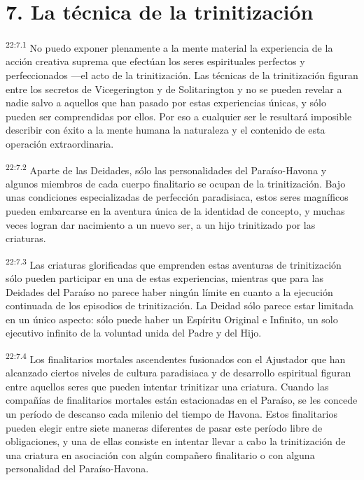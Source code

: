 \section*{7. La técnica de la trinitización}
\par
\textsuperscript{22:7.1} No puedo exponer plenamente a la mente material la experiencia de la acción creativa suprema que efectúan los seres espirituales perfectos y perfeccionados ---el acto de la trinitización. Las técnicas de la trinitización figuran entre los secretos de Vicegerington y de Solitarington y no se pueden revelar a nadie salvo a aquellos que han pasado por estas experiencias únicas, y sólo pueden ser comprendidas por ellos. Por eso a cualquier ser le resultará imposible describir con éxito a la mente humana la naturaleza y el contenido de esta operación extraordinaria.

\par
\textsuperscript{22:7.2} Aparte de las Deidades, sólo las personalidades del Paraíso-Havona y algunos miembros de cada cuerpo finalitario se ocupan de la trinitización. Bajo unas condiciones especializadas de perfección paradisiaca, estos seres magníficos pueden embarcarse en la aventura única de la identidad de concepto, y muchas veces logran dar nacimiento a un nuevo ser, a un hijo trinitizado por las criaturas.

\par
\textsuperscript{22:7.3} Las criaturas glorificadas que emprenden estas aventuras de trinitización sólo pueden participar en una de estas experiencias, mientras que para las Deidades del Paraíso no parece haber ningún límite en cuanto a la ejecución continuada de los episodios de trinitización. La Deidad sólo parece estar limitada en un único aspecto: sólo puede haber un Espíritu Original e Infinito, un solo ejecutivo infinito de la voluntad unida del Padre y del Hijo.

\par
\textsuperscript{22:7.4} Los finalitarios mortales ascendentes fusionados con el Ajustador que han alcanzado ciertos niveles de cultura paradisiaca y de desarrollo espiritual figuran entre aquellos seres que pueden intentar trinitizar una criatura. Cuando las compañías de finalitarios mortales están estacionadas en el Paraíso, se les concede un período de descanso cada milenio del tiempo de Havona. Estos finalitarios pueden elegir entre siete maneras diferentes de pasar este período libre de obligaciones, y una de ellas consiste en intentar llevar a cabo la trinitización de una criatura en asociación con algún compañero finalitario o con alguna personalidad del Paraíso-Havona.

